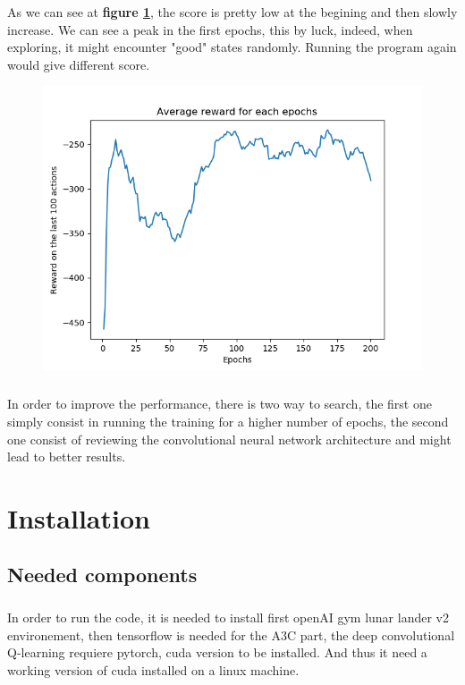\documentclass[14pt,a4paper,oneside]{report}
\begin{document}
As we can see at \textbf{ figure \ref{fig1}}, the score is pretty low at the begining and then slowly increase. We can see a peak in the first epochs, this by luck, indeed, when exploring, it might encounter "good" states randomly. Running the program again would give different score. 
\begin{figure}
	\centering
	\includegraphics[width=\textwidth]{Figure_1.png}
	\caption{}
	\label{fig1}
\end{figure}

\paragraph{} In order to improve the performance, there is two way to search, the first one simply consist in running the training for a higher number of epochs, the second one consist of reviewing the convolutional neural network architecture and might lead to better results. 
\appendix
\chapter{Installation}
\section{Needed components}
\paragraph{} In order to run the code, it is needed to install first openAI gym lunar lander v2 environement, then tensorflow is needed for the A3C part, the deep convolutional Q-learning requiere pytorch, cuda version to be installed. And thus it need a working version of cuda installed on a linux machine. 
\end{document}
